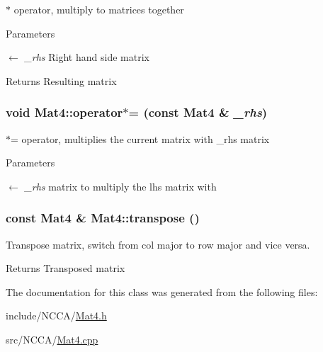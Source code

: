 $\ast$ operator, multiply to matrices together 
\begin{DoxyParams}{Parameters}
\item[\mbox{$\leftarrow$} {\em \_\-rhs}]Right hand side matrix \end{DoxyParams}
\begin{DoxyReturn}{Returns}
Resulting matrix 
\end{DoxyReturn}
\hypertarget{classMat4_a5b8ca6003dee9d49f2a008f1608bebaf}{
\subsubsection[{operator$\ast$=}]{\setlength{\rightskip}{0pt plus 5cm}void Mat4::operator$\ast$= (const {\bf Mat4} \& {\em \_\-rhs})}}
\label{classMat4_a5b8ca6003dee9d49f2a008f1608bebaf}


$\ast$= operator, multiplies the current matrix with \_\-rhs matrix 
\begin{DoxyParams}{Parameters}
\item[\mbox{$\leftarrow$} {\em \_\-rhs}]matrix to multiply the lhs matrix with \end{DoxyParams}
\hypertarget{classMat4_a822f5da810857bfd6f639c12aed6dd61}{
\subsubsection[{transpose}]{\setlength{\rightskip}{0pt plus 5cm}const {\bf Mat4} \& Mat4::transpose ()}}
\label{classMat4_a822f5da810857bfd6f639c12aed6dd61}


Transpose matrix, switch from col major to row major and vice versa. \begin{DoxyReturn}{Returns}
Transposed matrix 
\end{DoxyReturn}


The documentation for this class was generated from the following files:\begin{DoxyCompactItemize}
\item 
include/NCCA/\hyperlink{Mat4_8h}{Mat4.h}\item 
src/NCCA/\hyperlink{Mat4_8cpp}{Mat4.cpp}\end{DoxyCompactItemize}

